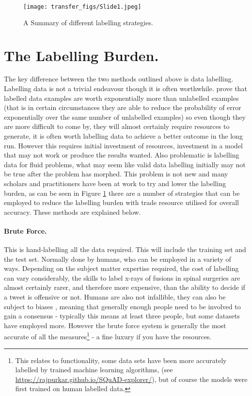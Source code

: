 \begin{figure}
  \texttt{[image: transfer\_figs/Slide1.jpeg]}
  \caption{A Summary of different labelling strategies. }
  \label{fig:label}
\end{figure}

\section{The Labelling Burden.} The key difference between the two methods outlined above is data labelling. Labelling data is not a trivial endeavour though it is often worthwhile.\textcite{castelli1995exponential}  prove that labelled data examples are worth exponentially more than unlabelled examples (that is in certain circumstances they are able to reduce the probability of error exponentially over the same number of unlabelled examples) so even though they are more difficult to come by, they will almost certainly require resources to generate, it is often worth labelling data to achieve a better outcome in the long run. However this requires initial investment of resources, investment in a model that may not work or produce the results wanted. Also problematic is labelling data for fluid problems, what may seem like valid data labelling initially may not be true after the problem has morphed. This problem is not new and many scholars and practitioners have been at work to try and lower the labelling burden, as can be seen in Figure \ref{fig:label}  there are a number of strategies that can be employed to reduce the labelling burden with trade resource utilised for overall accuracy. These methods are explained below.



\paragraph{Brute Force.} This is hand-labelling all the data required. This will include the training set and the test set. Normally done by humans, who can be employed in a variety of ways. Depending on the subject matter expertise required, the cost of labelling can vary considerably, the skills to label x-rays of fusions in spinal surgeries are almost certainly rarer, and therefore  more expensive, than the ability to decide if a tweet is offensive or not. Humans are also not infallible, they can also be subject to biases \parencite{kahneman2011thinking}, meaning that generally enough people need to be involved to gain a consensus - typically this means at least three people, but some datasets have employed more. However the brute force system is generally the most accurate of all the measures\footnote{This relates to  functionality, some data sets have been more accurately labelled by trained machine learning algorithms, (see \url{https://rajpurkar.github.io/SQuAD-explorer/}), but of course the models were first trained on human labelled data.}  - a fine luxury if you have the resources.

